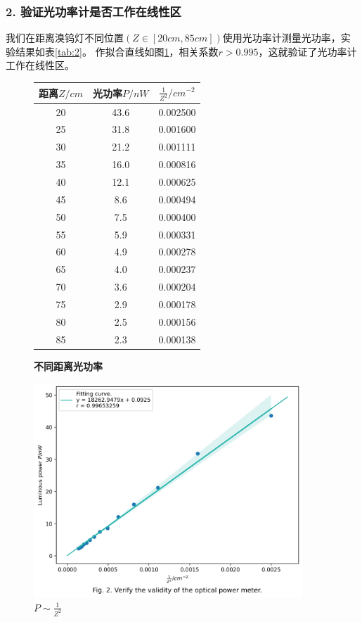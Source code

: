 \documentclass[12pt,a4paper,UTF8]{ctexart}
\begin{document}
\subsubsection*{2. 验证光功率计是否工作在线性区}
我们在距离溴钨灯不同位置$(Z \in [20cm , 85cm])$使用光功率计测量光功率，实验结果如表\ref{tab:2}。                                         
作拟合直线如图\ref{fig:2}，相关系数$r> 0.995$，这就验证了光功率计工作在线性区。

\begin{figure}[htbp]
\begin{minipage}{0.5\textwidth}
	\centering
	\begin{tabular}{ccc}
	\toprule
	距离$Z/cm$ &光功率$P/nW$ &$\frac{1}{Z^2}/cm^{-2}$ \\
	\midrule
	20  &43.6  &0.002500 \\
	25  &31.8  &0.001600 \\
	30  &21.2  &0.001111 \\
	35  &16.0  &0.000816 \\
	40  &12.1  &0.000625 \\
	45  & 8.6  &0.000494 \\
	50  & 7.5  &0.000400 \\
	55  & 5.9  &0.000331 \\
	60  & 4.9  &0.000278 \\
	65  & 4.0  &0.000237 \\
	70  & 3.6  &0.000204 \\
	75  & 2.9  &0.000178 \\
	80  & 2.5  &0.000156 \\
	85  & 2.3  &0.000138 \\
	\bottomrule
    \end{tabular}
	\caption{\textbf{不同距离光功率}}
	\label{tab:2}
\end{minipage}
\begin{minipage}{0.5\textwidth}
    \centering
	\includegraphics[width = 0.9\textwidth]{attachments//Fig.2.png}
	\caption{$P \sim \frac{1}{Z^2}$}
	\label{fig:2}
\end{minipage}
\end{figure}
\end{document}
